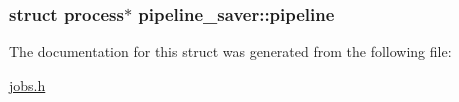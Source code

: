 \subsubsection[{\texorpdfstring{pipeline}{pipeline}}]{\setlength{\rightskip}{0pt plus 5cm}struct {\bf process}$\ast$ pipeline\+\_\+saver\+::pipeline}\hypertarget{structpipeline__saver_a150b4d503a5673894709f96b053de8b2}{}\label{structpipeline__saver_a150b4d503a5673894709f96b053de8b2}


The documentation for this struct was generated from the following file\+:\begin{DoxyCompactItemize}
\item 
\hyperlink{jobs_8h}{jobs.\+h}\end{DoxyCompactItemize}

